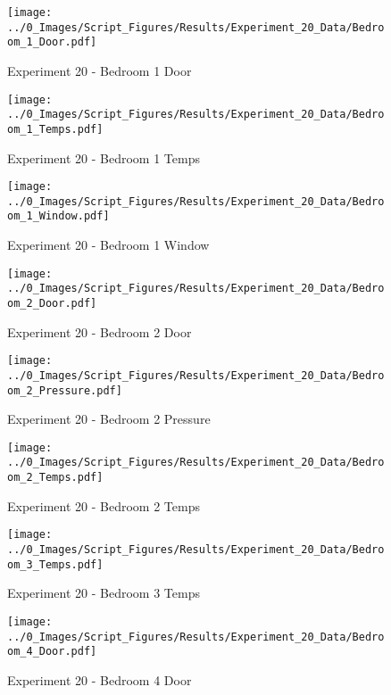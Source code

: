 	\begin{figure}[H]
		\centering
		\texttt{[image: ../0\_Images/Script\_Figures/Results/Experiment\_20\_Data/Bedroom\_1\_Door.pdf]}
		\caption[]{Experiment 20 - Bedroom 1 Door}
	\end{figure}
 

	\begin{figure}[H]
		\centering
		\texttt{[image: ../0\_Images/Script\_Figures/Results/Experiment\_20\_Data/Bedroom\_1\_Temps.pdf]}
		\caption[]{Experiment 20 - Bedroom 1 Temps}
	\end{figure}
 
	\clearpage

	\begin{figure}[H]
		\centering
		\texttt{[image: ../0\_Images/Script\_Figures/Results/Experiment\_20\_Data/Bedroom\_1\_Window.pdf]}
		\caption[]{Experiment 20 - Bedroom 1 Window}
	\end{figure}
 

	\begin{figure}[H]
		\centering
		\texttt{[image: ../0\_Images/Script\_Figures/Results/Experiment\_20\_Data/Bedroom\_2\_Door.pdf]}
		\caption[]{Experiment 20 - Bedroom 2 Door}
	\end{figure}
 
	\clearpage

	\begin{figure}[H]
		\centering
		\texttt{[image: ../0\_Images/Script\_Figures/Results/Experiment\_20\_Data/Bedroom\_2\_Pressure.pdf]}
		\caption[]{Experiment 20 - Bedroom 2 Pressure}
	\end{figure}
 

	\begin{figure}[H]
		\centering
		\texttt{[image: ../0\_Images/Script\_Figures/Results/Experiment\_20\_Data/Bedroom\_2\_Temps.pdf]}
		\caption[]{Experiment 20 - Bedroom 2 Temps}
	\end{figure}
 
	\clearpage

	\begin{figure}[H]
		\centering
		\texttt{[image: ../0\_Images/Script\_Figures/Results/Experiment\_20\_Data/Bedroom\_3\_Temps.pdf]}
		\caption[]{Experiment 20 - Bedroom 3 Temps}
	\end{figure}
 

	\begin{figure}[H]
		\centering
		\texttt{[image: ../0\_Images/Script\_Figures/Results/Experiment\_20\_Data/Bedroom\_4\_Door.pdf]}
		\caption[]{Experiment 20 - Bedroom 4 Door}
	\end{figure}
 
